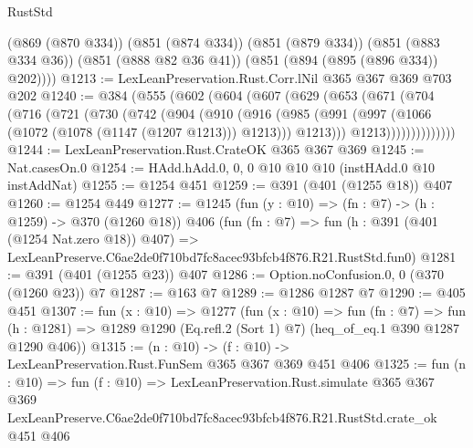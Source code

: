 \begin{lexlean}{RustStd}
\begin{coremodule}
        (@869 (@870 @334))
        (@851 (@874 @334))
        (@851 (@879 @334))
        (@851 (@883 @334 @36))
        (@851 (@888 @82 @36 @41))
        (@851 (@894 (@895 (@896 @334)) @202))))
@1213 := LexLeanPreservation.Rust.Corr.lNil @365 @367 @369 @703 @202
@1240 := @384
    (@555
      (@602
        (@604
          (@607
            (@629
              (@653
                (@671
                  (@704
                    (@716
                      (@721
                        (@730
                          (@742
                            (@904
                              (@910
                                (@916
                                  (@985
                                    (@991
                                      (@997 (@1066 (@1072 (@1078 (@1147 (@1207 @1213))) @1213)))
                                      @1213)))
                                @1213))))))))))))))
@1244 := LexLeanPreservation.Rust.CrateOK @365 @367 @369
@1245 := Nat.casesOn.{0}
@1254 := HAdd.hAdd.{0, 0, 0} @10 @10 @10 (instHAdd.{0} @10 instAddNat)
@1255 := @1254 @451
@1259 := @391 (@401 (@1255 @18)) @407
@1260 := @1254 @449
@1277 := @1245
    (fun (y : @10) => (fn : @7) -> (h : @1259) -> @370 (@1260 @18))
    @406
    (fun (fn : @7) =>
    fun (h : @391 (@401 (@1254 Nat.zero @18)) @407) =>
    LexLeanPreserve.C6ae2de0f710bd7fc8acec93bfcb4f876.R21.RustStd.fun0)
@1281 := @391 (@401 (@1255 @23)) @407
@1286 := Option.noConfusion.{0, 0} (@370 (@1260 @23)) @7
@1287 := @163 @7
@1289 := @1286 @1287 @7
@1290 := @405 @451
@1307 := fun (x : @10) =>
  @1277
    (fun (x : @10) =>
    fun (fn : @7) =>
    fun (h : @1281) => @1289 @1290 (Eq.refl.{2} (Sort 1) @7) (heq_of_eq.{1} @390 @1287 @1290 @406))
@1315 := (n : @10) -> (f : @10) -> LexLeanPreservation.Rust.FunSem @365 @367 @369 @451 @406
@1325 := fun (n : @10) =>
  fun (f : @10) =>
  LexLeanPreservation.Rust.simulate
    @365
    @367
    @369
    LexLeanPreserve.C6ae2de0f710bd7fc8acec93bfcb4f876.R21.RustStd.crate_ok
    @451
    @406
\end{coremodule}
\end{lexlean}
